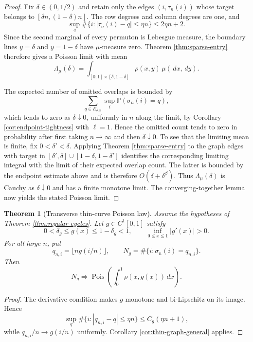 \documentclass[11pt]{article}
\newtheorem{theorem}{Theorem}[section]
\theoremstyle{remark}
\newcommand{\Pp}{\mathbb P}
\newcommand{\Pois}{\operatorname{Pois}}
\newcommand{\dd}{\,d}
\begin{document}
\begin{proof}
Fix $\delta\in(0,1/2)$ and retain only the edges
$(i,\tau_n(i))$ whose target belongs to
$[\delta n,(1-\delta)n]$.  The row degrees and column degrees are one, and
\[
        \sup_q\#\{i:|\tau_n(i)-q|\le\eta n\}
        \le 2\eta n+2.
\]
Since the second marginal of every permuton is Lebesgue measure, the boundary
lines $y=\delta$ and $y=1-\delta$ have $\mu$-measure zero.  Theorem
\ref{thm:sparse-entry} therefore gives a Poisson limit with mean
\[
        \Lambda_\mu(\delta)=
        \int_{[0,1]\times[\delta,1-\delta]}
        \rho(x,y)\,\mu(\dd x,\dd y).
\]

The expected number of omitted overlaps is bounded by
\[
        \sum_{q\in E_{\delta,n}}
        \sup_i\Pp(\sigma_n(i)=q),
\]
which tends to zero as $\delta\downarrow0$, uniformly in $n$ along the limit,
by Corollary \ref{cor:endpoint-tightness} with $\ell=1$.  Hence the omitted
count tends to zero in probability after first taking $n\to\infty$ and then
$\delta\downarrow0$.  To see that the limiting mean is finite, fix $0<\delta'<\delta$.  Applying
Theorem \ref{thm:sparse-entry} to the graph edges with target in
$[\delta',\delta]\cup[1-\delta,1-\delta']$ identifies the corresponding
limiting integral with the limit of their expected overlap count.  The latter
is bounded by the endpoint estimate above and is therefore
$O(\delta+\delta^\beta)$.  Thus $\Lambda_\mu(\delta)$ is Cauchy as
$\delta\downarrow0$ and has a finite monotone limit.  The
converging-together lemma now yields the stated Poisson limit.
\end{proof}

\begin{theorem}[Transverse thin-curve Poisson law]\label{thm:thin-curve-transverse}
Assume the hypotheses of Theorem \ref{thm:regular-cycles}.  Let
$g\in C^1[0,1]$ satisfy
\[
        0<\delta_g\le g(x)\le1-\delta_g<1,
        \qquad
        \inf_{0\le x\le1}|g'(x)|>0.
\]
For all large $n$, put
\[
        q_{n,i}=\lfloor ng(i/n)\rfloor,
        \qquad
        N_g=\#\{i:\sigma_n(i)=q_{n,i}\}.
\]
Then
\[
        N_g\Rightarrow
        \Pois\left(\int_0^1\rho(x,g(x))\dd x\right).
\]
\end{theorem}

\begin{proof}
The derivative condition makes $g$ monotone and bi-Lipschitz on its image.
Hence
\[
        \sup_q\#\{i:|q_{n,i}-q|\le\eta n\}
        \le C_g(\eta n+1),
\]
while $q_{n,i}/n\to g(i/n)$ uniformly.  Corollary
\ref{cor:thin-graph-general} applies.
\end{proof}
\end{document}
